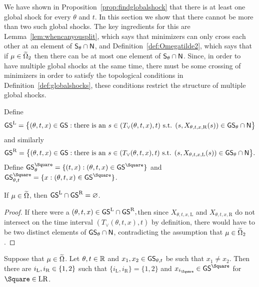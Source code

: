 \documentclass[AHL,Unicode,longabstracts]{cedram}
\newcommand*\ssS{\mathsf{S}}
\newcommand*\GS{\mathsf{GS}}
\newcommand*\ssN{\mathsf{N}}
\newcommand*\RR{\mathbb{R}}
\newcommand*\st{\mathrel{:}}
\newcommand*\Left{\mathrm{L}}
\newcommand*\Right{\mathrm{R}}
\newcommand*\LR{\mathrm{LR}}
\let\oldin\in
\renewcommand{\in}{\mathchoice{\oldin}{\oldin}{\,\oldin\,}{\,\oldin\,}}
\let\oldcap\cap
\renewcommand{\cap}{\mathchoice{\oldcap}{\oldcap}{\,\oldcap\,}{\,\oldcap\,}}
\newcommand*\RR{\mathbb{R}}
\begin{document}
We have shown in Proposition~\ref{prop:findglobalshock} that there is at least one global shock for every $\theta$ and $t$. In this section we show that there cannot be more than two such global shocks. The key ingredients for this are Lemma~\ref{lem:whencanyousplit}, which says that minimizers can only cross each other at an element of $\ssS_{\theta}\cap\ssN$, and Definition~\ref{def:Omegatilde2}, which says that if $\mu\in\widetilde{\Omega}_{2}$ then there can be at most one element of $\ssS_{\theta}\cap\ssN$. Since, in order to have multiple global shocks at the same time, there must be some crossing of minimizers in order to satisfy the topological conditions in Definition~\ref{def:globalshocks}, these conditions restrict the structure of multiple global shocks.

Define
\[
\GS^{\Left}=\bigl\{(\theta,t,x)\in\GS\st\text{there is an }s\in(T_{\vee}(\theta,t,x),t)\text{ s.t. }(s,X_{\theta,t,x,\Right}(s))\in\GS_{\theta}\cap\ssN\bigr\}
\]
and similarly
\[
\GS^{\Right}=\bigl\{(\theta,t,x)\in\GS\st\text{there is an }s\in(T_{\vee}(\theta,t,x),t)\text{ s.t. }(s,X_{\theta,t,x,\Left}(s))\in\GS_{\theta}\cap\ssN\bigr\}.
\]
Define $\GS_{\theta}^{\Square}=\{(t,x)\st(\theta,t,x)\in\GS^{\Square}\}$ and $\GS_{\theta,t}^{\Square}=
\{x\st(\theta,t,x)\in\GS^{\Square}\}$.
\begin{lemm}\label{lem:GSLnotintersect}
If $\mu\in\widetilde{\Omega}$, then $\GS^{\Left}\cap\GS^{\Right}=\varnothing$.
\end{lemm}

\begin{proof}
If there were a $(\theta,t,x)\in\GS^{\Left}\cap\GS^{\Right},$then since $X_{\theta,t,x,\Left}$ and $X_{\theta,t,x,\Right}$ do not intersect on the time interval $(T_{\vee}(\theta,t,x),t)$ by definition, there would have to be two distinct elements of $\GS_{\theta}\cap\ssN$, contradicting the assumption that $\mu\in\widetilde{\Omega}_{2}$.
\end{proof}


\begin{prop}\label{prop:findsplitpoint}
Suppose that $\mu\in\widetilde{\Omega}$. Let $\theta,t\in\RR$ and $x_{1},x_{2}\in\GS_{\theta,t}$ be such that $x_{1}\ne x_{2}$. Then there are $i_{\Left},i_{\Right}\in\{1,2\}$ such that $\{i_{\Left},i_{\Right}\}=\{1,2\}$ and $x_{i_{\Square}}\in\GS^{\Square}$ for $\Square\in\LR$.
\end{prop}
\end{document}
